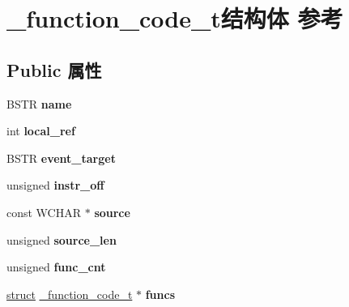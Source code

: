 \hypertarget{struct__function__code__t}{}\section{\+\_\+function\+\_\+code\+\_\+t结构体 参考}
\label{struct__function__code__t}
\subsection*{Public 属性}
\begin{DoxyCompactItemize}
\item 
\mbox{\label{struct__function__code__t_a63e963f09ea6b06168ee5e7bcf600c9b}} 
B\+S\+TR {\bfseries name}
\item 
\mbox{\label{struct__function__code__t_a3c747fa44fdf202afa7a15fa8937c841}} 
int {\bfseries local\+\_\+ref}
\item 
\mbox{\label{struct__function__code__t_a3d31cdf117027eca838a149aed89ed9b}} 
B\+S\+TR {\bfseries event\+\_\+target}
\item 
\mbox{\label{struct__function__code__t_ac799b81acc832d63205f1038cfb4cb75}} 
unsigned {\bfseries instr\+\_\+off}
\item 
\mbox{\label{struct__function__code__t_ab60472df6f3d43d68649ecd70b567323}} 
const W\+C\+H\+AR $\ast$ {\bfseries source}
\item 
\mbox{\label{struct__function__code__t_a95b3d14b447ce31ac365a9e6d99526cf}} 
unsigned {\bfseries source\+\_\+len}
\item 
\mbox{\label{struct__function__code__t_a5a2bb3596dd2f4f4cb1ac20e9e36ce59}} 
unsigned {\bfseries func\+\_\+cnt}
\item 
\mbox{\label{struct__function__code__t_a3b7eaa7020e3b7e882f55b7e18139c06}} 
\hyperlink{interfacestruct}{struct} \hyperlink{struct__function__code__t}{\+\_\+function\+\_\+code\+\_\+t} $\ast$ {\bfseries funcs}
\item 

\end{DoxyCompactItemize}
